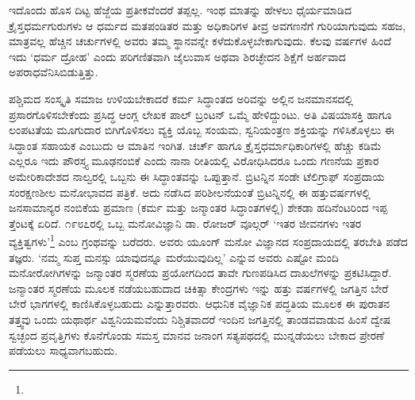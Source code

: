 ಇದೊಂದು ಹೊಸ ದಿಟ್ಟ ಹೆಜ್ಜೆಯ ಪ್ರತೀಕವೆಂದರೆ ತಪ್ಪಲ್ಲ. ಇಂಥ ಮಾತನ್ನು ಹೇಳಲು ಧೈರ್ಯಮಾಡಿದ ಕ್ರೈಸ್ತಧರ್ಮಗುರುಗಳು ಆ ಧರ್ಮದ ಮತಪಂಡಿತರ ಮತ್ತು ಅಧಿಕಾರಿಗಳ ತೀವ್ರ ಅವಗಣನೆಗೆ ಗುರಿಯಾಗುವುದು ಸಹಜ, ಮಾತ್ರವಲ್ಲ ಹೆಚ್ಚಿನ ಚರ್ಚುಗಳಲ್ಲಿ ಅವರು ತಮ್ಮ ಸ್ಥಾನವನ್ನೇ ಕಳೆದುಕೊಳ್ಳಬೇಕಾಗುವುದು. ಕೆಲವು ವರ್ಷಗಳ ಹಿಂದೆ ಇದು ‘ಧರ್ಮ ದ್ರೋಹ’ ಎಂದು ಪರಿಗಣಿತವಾಗಿ ಜೈಲುವಾಸ ಅಥವಾ ಶಿರಚ್ಛೇದನ ಶಿಕ್ಷೆಗೆ ಅರ್ಹವಾದ ಅಪರಾಧ\-ವೆನಿಸಿ\-ಬಿಡುತ್ತಿತ್ತು.

ಪಶ್ಚಿಮದ ಸಂಸ್ಕೃತಿ ಸಮಾಜ ಉಳಿಯಬೇಕಾದರೆ ಕರ್ಮ ಸಿದ್ಧಾಂತದ ಅರಿವನ್ನು ಅಲ್ಲಿನ ಜನಮಾನಸದಲ್ಲಿ ಪ್ರಸಾರಗೊಳಿಸಬೇಕೆಂದು ಪ್ರಸಿದ್ಧ ಆಂಗ್ಲ ಲೇಖಕ ಪಾಲ್ ಬ್ರಂಟನ್ ಒಮ್ಮೆ ಹೇಳಿದ್ದುಂಟು. ಅತಿ ವಿಷಯಾಸಕ್ತಿ ಹಾಗೂ ಲಂಪಟತೆಯ ಮೂಗುದಾರ ಬಿಗಿಗೊಳಿಸಲು ವ್ಯಕ್ತಿ ಯೊಬ್ಬ ಸಂಯಮ, ಸ್ವನಿಯಂತ್ರಣ ಶಕ್ತಿಯನ್ನು ಗಳಿಸಿಕೊಳ್ಳಲು ಈ ಸಿದ್ಧಾಂತ ಸಹಾಯಕ ಎಂಬುದು ಆ ಮಾತಿನ ಇಂಗಿತ. ಚರ್ಚ್ ಹಾಗೂ ಕ್ರೈಸ್ತಧರ್ಮಾಧಿಕಾರಿಗಳಲ್ಲಿ ಹೆಚ್ಚು ಕಡಿಮೆ ಎಲ್ಲರೂ ಇದು ಪೌರಸ್ತ್ಯ ಮೂಢನಂಬಿಕೆ ಎಂದು ನಾನಾ ರೀತಿಯಲ್ಲಿ ವಿರೋಧಿಸಿದರೂ ಒಂದು ಗಣನೆಯ ಪ್ರಕಾರ ಅಮೇರಿಕಾದೇಶದ ನಾಲ್ವರಲ್ಲಿ ಒಬ್ಬನು ಈ ಸಿದ್ಧಾಂತವನ್ನು ಒಪ್ಪುತ್ತಾನೆ. ಬ್ರಿಟನ್ನಿನ ಸಂಡೇ ಟೆಲಿಗ್ರಾಫ್ ಸಂಪ್ರದಾಯ ಸಂರಕ್ಷಣಶೀಲ ಮನೋಭಾವದ ಪತ್ರಿಕೆ. ಅದು ನಡೆಸಿದ ಪರಿಶೀಲನೆಯಂತೆ ಬ್ರಿಟನ್ನಿನಲ್ಲಿ ಈ ಹತ್ತುವರ್ಷಗಳಲ್ಲಿ ಜನಸಾಮಾನ್ಯರ ನಂಬಿಕೆಯ ಪ್ರಮಾಣ (ಕರ್ಮ ಮತ್ತು ಜನ್ಮಾಂತರ ಸಿದ್ಧಾಂತಗಳಲ್ಲಿ) ಶೇಕಡಾ ಹದಿನೆಂಟರಿಂದ ಇಪ್ಪ ತ್ತೆಂಟಕ್ಕೆ ಏರಿದೆ. ೧೯೮೭ರಲ್ಲಿ ಒಬ್ಬ ಮನೋವಿಜ್ಞಾನಿ ಡಾ. ರೋಜರ್ ವೂಲ್ಗರ್ ‘ಇತರ ಜೀವನಗಳು ಇತರ ವ್ಯಕ್ತಿತ್ವಗಳು’\footnote{\hfill{}} ಎಂಬ ಗ್ರಂಥವನ್ನು ಬರೆದರು. ಅವರು ಯೂಂಗ್ ಮನೋ ವಿಜ್ಞಾನದ ಸಂಪ್ರದಾಯದಲ್ಲಿ ತರಬೇತಿ ಪಡೆದ ತಜ್ಞರು. ‘ನಮ್ಮ ಸುಪ್ತ ಮನಸ್ಸು ಯಾವುದನ್ನೂ ಮರೆಯುವುದಿಲ್ಲ’ ಎನ್ನುವ ಅವರು ಎಷ್ಟೋ ಮಂದಿ ಮನೋರೋಗಿಗಳನ್ನು ಜನ್ಮಾಂತರ ಸ್ಮರಣೆಯ ಪ್ರಯೋಗದಿಂದ ತಾವೇ ಗುಣಪಡಿಸಿದ ದಾಖಲೆಗಳನ್ನು ಪ್ರಕಟಿಸಿದ್ದಾರೆ. ಜನ್ಮಾಂತರ ಸ್ಮರಣೆಯ ಮೂಲಕ ನಡೆಯಬಹುದಾದ ಚಿಕಿತ್ಸಾ ಕೇಂದ್ರಗಳು ಇನ್ನು ಹತ್ತು ವರ್ಷಗಳಲ್ಲಿ ಜಗತ್ತಿನ ಬೇರೆ ಬೇರೆ ಭಾಗಗಳಲ್ಲಿ ಕಾಣಿಸಿಕೊಳ್ಳಬಹುದು ಎನ್ನುತ್ತಾರವರು. ಆಧುನಿಕ ವೈಜ್ಞಾನಿಕ ಪದ್ಧತಿಯ ಮೂಲಕ ಈ ಪುರಾತನ ತತ್ತ್ವವು ಒಂದು ಯಥಾರ್ಥ ವಿಶ್ವನಿಯಮವೆಂದು ನಿಶ್ಚಿತವಾದರೆ ಇಂದಿನ ಜಗತ್ತಿನಲ್ಲಿ ತಾಂಡವವಾಡುವ ಹಿಂಸೆ ದ್ವೇಷ ಸ್ವಚ್ಛಂದ ಪ್ರವೃತ್ತಿಗಳು ಕೊನೆಗೊಂಡು ಸಮಸ್ತ ಮಾನವ ಜನಾಂಗ ಸತ್ಯಪಥದಲ್ಲಿ ಮುನ್ನಡೆಯಲು ಬೇಕಾದ ಪ್ರೇರಣೆ ಪಡೆಯಲು ಸಾಧ್ಯವಾಗಬಹುದು.

\chapterend


